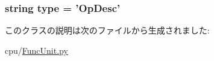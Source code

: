 \label{classFuncUnit_1_1OpDesc_a74d6c7d348235c1e30e0fd7c1322a773}
\hypertarget{classFuncUnit_1_1OpDesc_acce15679d830831b0bbe8ebc2a60b2ca}{
\subsubsection[{type}]{\setlength{\rightskip}{0pt plus 5cm}string {\bf type} = '{\bf OpDesc}'}}
\label{classFuncUnit_1_1OpDesc_acce15679d830831b0bbe8ebc2a60b2ca}


このクラスの説明は次のファイルから生成されました:\begin{DoxyCompactItemize}
\item 
cpu/\hyperlink{FuncUnit_8py}{FuncUnit.py}\end{DoxyCompactItemize}
